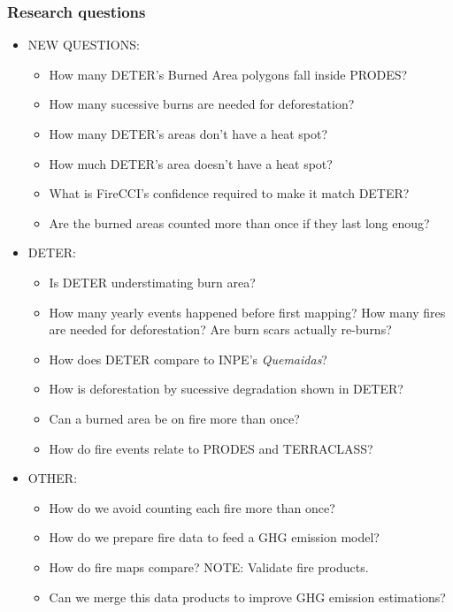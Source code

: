 \documentclass{beamer}
\begin{document}
\begin{frame}[t, allowframebreaks]
    \frametitle{Research questions}
    \begin{itemize}
        \item NEW QUESTIONS:
        \begin{itemize}
            \item How many DETER's Burned Area polygons fall inside PRODES?
            \item How many sucessive burns are needed for deforestation?
            \item How many DETER's areas don't have a heat spot?
            \item How much DETER's area doesn't have a heat spot?
            \item What is FireCCI's confidence required to make it match DETER?
            \item Are the burned areas counted more than once if they last long
                enoug?
        \end{itemize}
        \item DETER:
        \begin{itemize}
            \item Is DETER understimating burn area?
            \item How many yearly events happened before first mapping? How 
                many fires are needed for deforestation? Are burn scars 
                actually re-burns?
            \item How does DETER compare to INPE's \textit{Quemaidas}?
            \item How is deforestation by sucessive degradation shown in DETER?
            \item Can a burned area be on fire more than once?
            \item How do fire events relate to PRODES and TERRACLASS?
        \end{itemize}
        \item OTHER:
        \begin{itemize}
            \item How do we avoid counting each fire more than once? 
            \item How do we prepare fire data to feed a GHG emission model?
            \item How do fire maps compare? NOTE: Validate fire products. 
            \item Can we merge this data products to improve GHG emission 
                estimations?

\end{itemize}
\end{itemize}
\end{frame}
\end{document}

